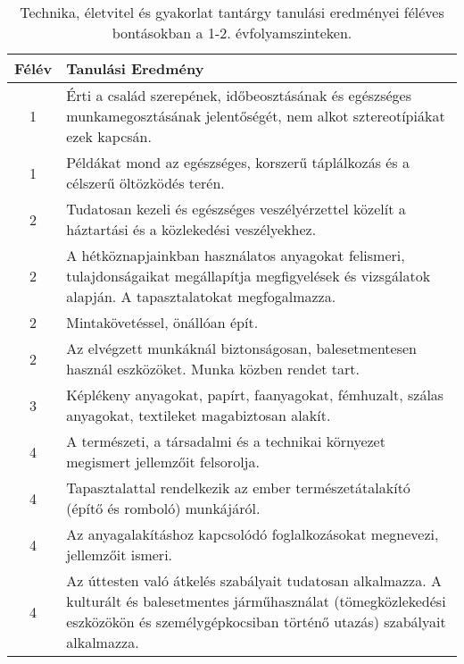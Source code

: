        
           \begin{longtable}{c | p{12cm} }
            \caption[Technika, életvitel és gyakorlat 1-2.]{Technika, életvitel és gyakorlat tantárgy tanulási eredményei féléves bontásokban a 1-2. évfolyamszinteken. }  \\

            \textbf{Félév} & \textbf{Tanulási Eredmény} \\
            \hline
            \endhead
                                
                                          1 &  Érti a család szerepének, időbeosztásának és egészséges munkamegosztásának jelentőségét, nem alkot sztereotípiákat ezek kapcsán. \\ \hline
                                          1 &  Példákat mond az egészséges, korszerű táplálkozás és a célszerű öltözködés terén. \\ \hline
                                      
                                
                                          2 &  Tudatosan kezeli és egészséges veszélyérzettel közelít a háztartási és a közlekedési veszélyekhez. \\ \hline
                                          2 &  A hétköznapjainkban használatos anyagokat felismeri, tulajdonságaikat megállapítja megfigyelések és vizsgálatok alapján. A tapasztalatokat megfogalmazza. \\ \hline
                                          2 &  Mintakövetéssel, önállóan épít. \\ \hline
                                          2 &  Az elvégzett munkáknál biztonságosan, balesetmentesen használ eszközöket. Munka közben rendet tart. \\ \hline
                                      
                                
                                          3 &  Képlékeny anyagokat, papírt, faanyagokat, fémhuzalt, szálas anyagokat, textileket magabiztosan alakít. \\ \hline
                                      
                                
                                          4 &  A természeti, a társadalmi és a technikai környezet megismert jellemzőit felsorolja. \\ \hline
                                          4 &  Tapasztalattal rendelkezik az ember természetátalakító (építő és romboló) munkájáról. \\ \hline
                                          4 &  Az anyagalakításhoz kapcsolódó foglalkozásokat megnevezi, jellemzőit ismeri. \\ \hline
                                          4 &  Az úttesten való átkelés szabályait tudatosan alkalmazza. A kulturált és balesetmentes járműhasználat (tömegközlekedési eszközökön és személygépkocsiban történő utazás) szabályait alkalmazza. \\ \hline
                                      
                        \end{longtable}
            \clearpage

